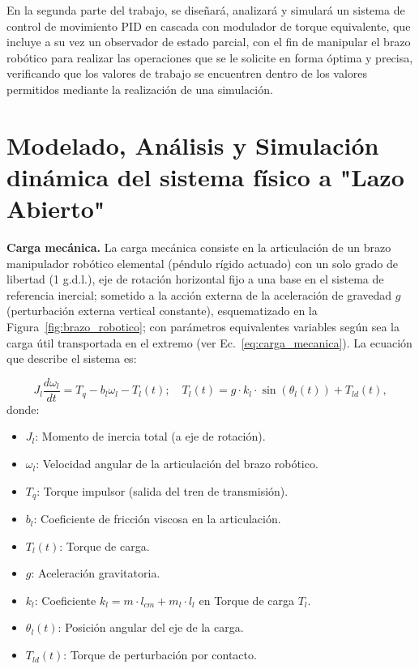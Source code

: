 \documentclass{article}
\begin{document}
En la segunda parte del trabajo, se diseñará, analizará y simulará un sistema de control de movimiento PID en cascada con modulador de torque equivalente, que incluye a su vez un observador de estado parcial, con el fin de manipular el brazo robótico para realizar las operaciones que se le solicite en forma óptima y precisa, verificando que los valores de trabajo se encuentren dentro de los valores permitidos mediante la realización de una simulación.



\section{Modelado, Análisis y Simulación dinámica del sistema físico a "Lazo Abierto"}

\textbf{Carga mecánica.}
La carga mecánica consiste en la articulación de un brazo manipulador robótico elemental (péndulo rígido actuado) con un solo grado de libertad (1 g.d.l.), eje de rotación horizontal fijo a una base en el sistema de referencia inercial; sometido a la acción externa de la aceleración de gravedad \( g \) (perturbación externa vertical constante), esquematizado en la Figura~\ref{fig:brazo_robotico}; con parámetros equivalentes variables según sea la carga útil transportada en el extremo (ver Ec.~\ref{eq:carga_mecanica}). La ecuación que describe el sistema es:

\begin{equation}
    J_l \frac{d\omega_l}{dt} = T_q - b_l \omega_l - T_l(t); \quad T_l(t) = g \cdot k_l \cdot \sin(\theta_l(t)) + T_{ld}(t),
    \label{eq:carga_mecanica}
\end{equation}
donde:
\begin{itemize}
    \item \( J_l \): Momento de inercia total (a eje de rotación).
    \item \( \omega_l \): Velocidad angular de la articulación del brazo robótico.
    \item \( T_q \): Torque impulsor (salida del tren de transmisión).
    \item \( b_l \): Coeficiente de fricción viscosa en la articulación.
    \item \( T_l(t) \): Torque de carga.
    \item \( g \): Aceleración gravitatoria.
    \item \( k_l \): Coeficiente \( k_l = m \cdot l_{cm} + m_l \cdot l_l \) en Torque de carga \( T_l \).
    \item \( \theta_l(t) \): Posición angular del eje de la carga.
    \item \( T_{ld}(t) \): Torque de perturbación por contacto.
\end{itemize}
\end{document}
